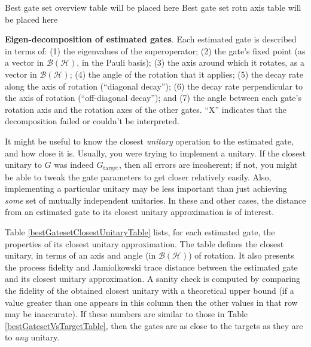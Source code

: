 \documentclass{article}[11pt]
\newcommand{\putfield}[2]{#2}
\begin{document}
\begin{table}[h]
\small
\begin{center}
\putfield{bestGatesetDecompTable}{Best gate set overview table will be placed here}
\vspace{2em}
\putfield{bestGatesetRotnAxisTable}{Best gate set rotn axis table will be placed here}
\caption{\putfield{tt_bestGatesetDecompTable}{}\putfield{tt_bestGatesetRotnAxisTable}{}\textbf{Eigen-decomposition of estimated gates}.  Each estimated gate is described in terms of: (1) the eigenvalues of the superoperator; (2) the gate's fixed point (as a vector in $\mathcal{B}(\mathcal{H})$, in the Pauli basis); (3)  the axis around which it rotates, as a vector in $\mathcal{B}(\mathcal{H})$; (4) the angle of the rotation that it applies; (5) the decay rate along the axis of rotation (``diagonal decay''); (6) the decay rate perpendicular to the axis of rotation (``off-diagonal decay''); and (7) the angle between each gate's rotation axis and the rotation axes of the other gates.  ``X'' indicates that the decomposition failed or couldn't be interpreted. \label{bestGatesetDecompTable}}
\end{center}
\end{table}

It might be useful to know the closest \emph{unitary} operation to the estimated gate, and how close it is.  Usually, you were trying to implement a unitary.  If the closest unitary to $G$ was indeed $G_{\mathrm{target}}$, then all errors are incoherent; if not, you might be able to tweak the gate parameters to get closer relatively easily.  Also, implementing a particular unitary may be less important than just achieving \emph{some} set of mutually independent unitaries.  In these and other cases, the distance from an estimated gate to its closest unitary approximation is of interest.

Table \ref{bestGatesetClosestUnitaryTable} lists, for each estimated gate, the properties of its closest unitary approximation.  The table defines the closest unitary, in terms of an axis and angle (in $\mathcal{B}(\mathcal{H})$) of rotation.  It also presents the process fidelity and Jamiolkowski trace distance between the estimated gate and its closest unitary approximation.  A sanity check is computed by comparing the fidelity of the obtained closest unitary with a theoretical upper bound (if a value greater than one appears in this column then the other values in that row may be inaccurate).  If these numbers are similar to those in Table \ref{bestGatesetVsTargetTable}, then the gates are as close to the targets as they are to \emph{any} unitary.
\end{document}
